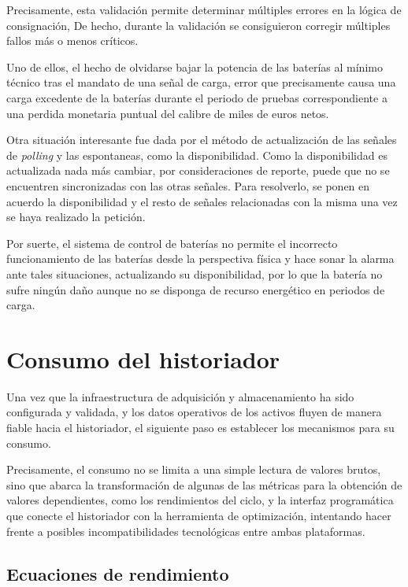 Precisamente, esta validación permite determinar múltiples errores en la lógica de consignación, De hecho, durante la validación se consiguieron corregir múltiples fallos más o menos críticos.

Uno de ellos, el hecho de olvidarse bajar la potencia de las baterías al mínimo técnico tras el mandato de una señal de carga, error que precisamente causa una carga excedente de la baterías durante el periodo de pruebas correspondiente a una perdida monetaria puntual del calibre de miles de euros netos.

Otra situación interesante fue dada por el método de actualización de las señales de \textit{polling} y las espontaneas, como la disponibilidad. Como la disponibilidad es actualizada nada más cambiar, por consideraciones de reporte, puede que no se encuentren sincronizadas con las otras señales. Para resolverlo, se ponen en acuerdo la disponibilidad y el resto de señales relacionadas con la misma una vez se haya realizado la petición.

Por suerte, el sistema de control de baterías no permite el incorrecto funcionamiento de las baterías desde la perspectiva física y hace sonar la alarma ante tales situaciones, actualizando su disponibilidad, por lo que la batería no sufre ningún daño aunque no se disponga de recurso energético en periodos de carga.

\section{Consumo del historiador}%
\label{makereference3.5}

Una vez que la infraestructura de adquisición y almacenamiento ha sido configurada y validada, y los datos operativos de los activos fluyen de manera fiable hacia el historiador, el siguiente paso es establecer los mecanismos para su consumo.

Precisamente, el consumo no se limita a una simple lectura de valores brutos, sino que abarca la transformación de algunas de las métricas para la obtención de valores dependientes, como los rendimientos del ciclo, y la interfaz programática que conecte el historiador con la herramienta de optimización, intentando hacer frente a posibles incompatibilidades tecnológicas entre ambas plataformas.

\subsection{Ecuaciones de rendimiento}%
\label{makereference3.5.1}

